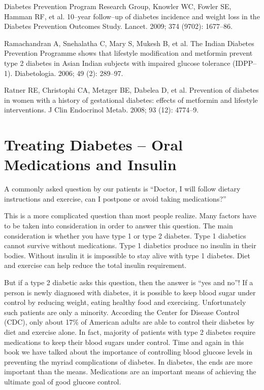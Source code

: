 \begin{thebibliography}{99}
 Diabetes Prevention Program Research Group, Knowler WC, Fowler SE, Hamman RF, et al. 10–year follow–up of diabetes incidence and weight loss in the Diabetes Prevention Outcomes Study. Lancet. 2009; 374 (9702): 1677–86.

  Ramachandran A, Snehalatha C, Mary S, Mukesh B, et al. The Indian Diabetes Prevention Programme shows that lifestyle modification and metformin prevent type 2 diabetes in Asian Indian subjects with impaired glucose tolerance (IDPP–1). Diabetologia. 2006; 49 (2): 289–97.

  Ratner RE, Christophi CA, Metzger BE, Dabelea D, et al. Prevention of diabetes in women with a history of gestational diabetes: effects of metformin and lifestyle interventions. J Clin Endocrinol Metab. 2008; 93 (12): 4774–9.

 \end{thebibliography}


\chapter{Treating Diabetes – Oral Medications and Insulin}\label{chap26}

A commonly asked question by our patients is “Doctor, I will follow dietary instructions and exercise, can I postpone or avoid taking medications?”

This is a more complicated question than most people realize. Many factors have to be taken into consideration in order to answer this question. The main consideration is whether you have type 1 or type 2 diabetes. Type 1 diabetics cannot survive without medications. Type 1 diabetics produce no insulin in their bodies. Without insulin it is impossible to stay alive with type 1 diabetes. Diet and exercise can help reduce the total insulin requirement.

But if a type 2 diabetic asks this question, then the answer is “yes and no”! If a person is newly diagnosed with diabetes, it is possible to keep blood sugar under control by reducing weight, eating healthy food and exercising. Unfortunately such patients are only a minority. According the Center for Disease Control (CDC), only about 17\% of American adults are able to control their diabetes by diet and exercise alone. In fact, majority of patients with type 2 diabetes require medications to keep their blood sugars under control. Time and again in this book we have talked about the importance of controlling blood glucose levels in preventing the myriad complications of diabetes. In diabetes, the ends are more important than the means. Medications are an important means of achieving the ultimate goal of good glucose control.

